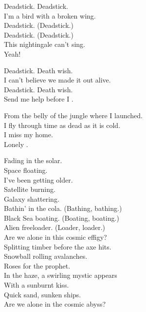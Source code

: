 
Deadstick. Deadstick. \\
I'm a bird with a broken wing. \\
Deadstick. (Deadstick.) \\
Deadstick. (Deadstick.) \\
This nightingale can't sing. \\
Yeah! \\


Deadstick. Death wish. \\
I can't believe we made it out alive. \\
Deadstick. Death wish. \\
Send me help before I . \\





From the belly of the jungle where I launched. \\
I fly through time as dead as it is cold. \\
I miss my home. \\
Lonely . \\


Fading in the solar. \\
Space  floating. \\
I've been getting older. \\
Satellite burning. \\
Galaxy shattering. \\

Bathin' in the cola. (Bathing, bathing.) \\
Black Sea boating. (Boating, boating.) \\
Alien freeloader. (Loader, loader.) \\
Are we alone in this cosmic effigy? \\

Splitting timber before the axe hits. \\
Snowball rolling avalanches. \\
Roses for the prophet. \\
In the haze, a swirling mystic appears \\
With a sunburnt kiss. \\
Quick sand, sunken ships. \\
Are we alone in the cosmic abyss? \\

